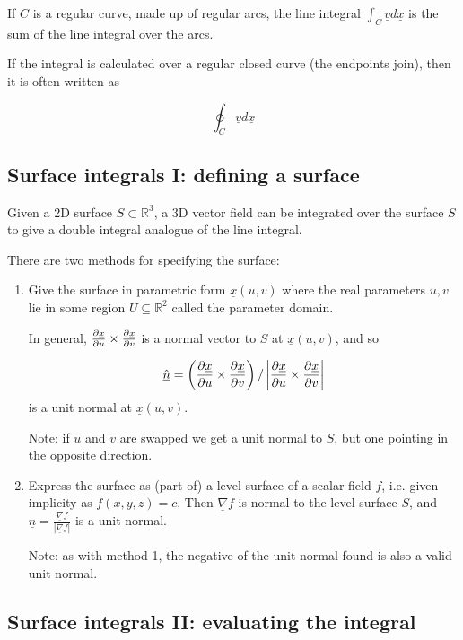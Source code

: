 If $C$ is a regular curve, made up of regular arcs, the line integral $\int_C \underline{v} d\underline{x}$ is the sum of the line integral over the arcs.

If the integral is calculated over a regular closed curve (the endpoints join), then it is often written as

\[\oint_C \underline{v} d\underline{x}\]

\subsection{Surface integrals I: defining a surface}


Given a 2D surface $S \subset \mathbb{R}^3$, a 3D vector field can be integrated over the surface $S$ to give a double integral analogue of the line integral.

There are two methods for specifying the surface:

\begin{enumerate}
	\item Give the surface in parametric form $\underline{x}(u, v)$ where the real parameters $u, v$ lie in some region $U \subseteq \mathbb{R}^2$ called the parameter domain.
	
	In general, $\diffp{\underline{x}}{u} \times \diffp{\underline{x}}{v}$ is a normal vector to $S$ at $\underline{x}(u, v)$, and so
	
	\[ \hat{\underline{n}} = \left( \diffp{\underline{x}}{u} \times \diffp{\underline{x}}{v} \right) / \left| \diffp{\underline{x}}{u} \times \diffp{\underline{x}}{v} \right| \] is a unit normal at $\underline{x}(u, v)$.

	Note: if $u$ and $v$ are swapped we get a unit normal to $S$, but one pointing in the opposite direction.
	\item Express the surface as (part of) a level surface of a scalar field $f$, i.e. given implicity as $f(x, y, z) = c$. Then $\underline{\nabla}f$ is normal to the level surface $S$, and $\hat{\underline{n}} = \frac{\underline{\nabla}f}{|\underline{\nabla}f|}$ is a unit normal.
	
	Note: as with method 1, the negative of the unit normal found is also a valid unit normal.
\end{enumerate}

\subsection{Surface integrals II: evaluating the integral}

